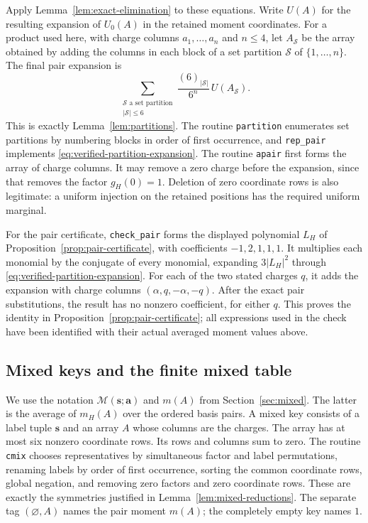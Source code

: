 Apply Lemma~\ref{lem:exact-elimination} to these equations.  Write
$U(A)$ for the resulting expansion of $U_0(A)$ in the retained moment
coordinates.  For a product used here, with charge columns
$a_1,\ldots,a_n$ and $n\le4$, let
$A_{\mathcal S}$ be the array obtained by adding the columns in each
block of a set partition $\mathcal S$ of $\{1,\ldots,n\}$.  The final
pair expansion is
\begin{equation}
 \sum_{\substack{\mathcal S\text{ a set partition}\\|\mathcal S|\le6}}
 \frac{(6)_{|\mathcal S|}}{6^n}\,U(A_{\mathcal S}).
 \label{eq:verified-partition-expansion}
\end{equation}
This is exactly Lemma~\ref{lem:partitions}.  The routine
\texttt{partition} enumerates set partitions by numbering blocks in
order of first occurrence, and \texttt{rep\_pair} implements
\eqref{eq:verified-partition-expansion}.  The routine \texttt{apair}
first forms the array of charge columns.  It may remove a zero charge
before the expansion, since that removes the factor $g_H(0)=1$.
Deletion of zero coordinate rows is also legitimate: a uniform
injection on the retained positions has the required uniform marginal.

For the pair certificate, \texttt{check\_pair} forms the displayed
polynomial $L_H$ of Proposition~\ref{prop:pair-certificate}, with
coefficients $-1,2,1,1,1$.  It multiplies each monomial by the conjugate
of every monomial, expanding $3|L_H|^2$ through
\eqref{eq:verified-partition-expansion}.  For each of the two stated
charges $q$, it adds the expansion with charge columns
$(\alpha,q,-\alpha,-q)$.  After the exact pair substitutions, the
result has no nonzero coefficient, for either $q$.  This proves the
identity in Proposition~\ref{prop:pair-certificate}; all expressions
used in the check have been identified with their actual averaged
moment values above.

\subsection{Mixed keys and the finite mixed table}

We use the notation $\mathcal M(\mathbf s;\mathbf a)$ and $m(A)$ from
Section~\ref{sec:mixed}.  The latter is the average of $m_H(A)$ over
the ordered basis pairs.  A mixed key consists of a label tuple
$\mathbf s$ and an array $A$ whose columns are the charges.  The array
has at most six nonzero coordinate rows.  Its rows and columns sum to
zero.  The routine \texttt{cmix} chooses representatives by simultaneous
factor and label permutations, renaming labels by order of first
occurrence, sorting the common coordinate rows, global negation, and
removing zero factors and zero coordinate rows.  These are exactly the
symmetries justified in Lemma~\ref{lem:mixed-reductions}.  The separate
tag $(\varnothing,A)$ names the pair moment $m(A)$; the completely empty
key names $1$.

